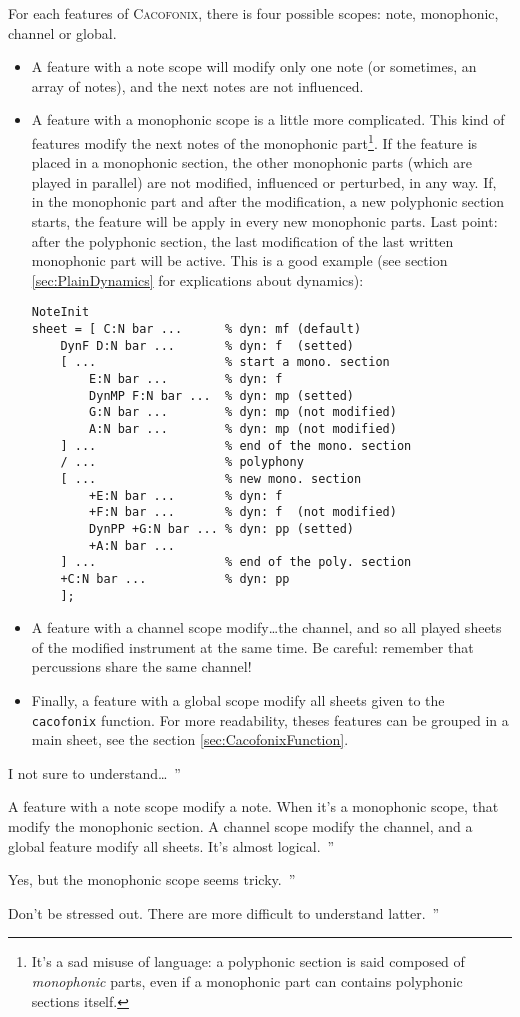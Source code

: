 \documentclass{article}
\newcommand{\cacofonix}{\textsc{Cacofonix}\xspace}
\newenvironment{meenv}{ \par \noindent \makebox[6em][r]{ \textcolor{mecolor}{Me}: `` --~}}{~''}
\newenvironment{myselfenv}{ \par \noindent \makebox[6em][r]{ \textcolor{myselfcolor}{Myself}: `` --~}}{~''}
\newcommand{\me}[1]{\begin{meenv}#1\end{meenv}}
\newcommand{\myself}[1]{\begin{myselfenv}#1\end{myselfenv}}
\begin{document}
For each features of \cacofonix, there is four possible scopes: note, monophonic, channel or global.
\begin{itemize}
	\item A feature with a note scope will modify only one note (or sometimes, an array of notes), and the next notes are not influenced.
	\item A feature with a monophonic scope is a little more complicated. This kind of features modify the next notes of the monophonic part\footnote{It's a sad misuse of language: a polyphonic section is said composed of \emph{monophonic} parts, even if a monophonic part can contains polyphonic sections itself.}. If the feature is placed in a monophonic section, the other monophonic parts (which are played in parallel) are not modified, influenced or perturbed, in any way. If, in the monophonic part and after the modification, a new polyphonic section starts, the feature will be apply in every new monophonic parts. Last point: after the polyphonic section, the last modification of the last written monophonic part will be active. This is a good example (see section \ref{sec:PlainDynamics} for explications about dynamics):
\begin{lstlisting}
NoteInit
sheet = [ C:N bar ...      % dyn: mf (default)
	DynF D:N bar ...       % dyn: f  (setted)
	[ ...                  % start a mono. section
		E:N bar ...        % dyn: f
		DynMP F:N bar ...  % dyn: mp (setted)
		G:N bar ...        % dyn: mp (not modified)
		A:N bar ...        % dyn: mp (not modified)
	] ...                  % end of the mono. section
	/ ...                  % polyphony
	[ ...                  % new mono. section
		+E:N bar ...       % dyn: f
		+F:N bar ...       % dyn: f  (not modified)
		DynPP +G:N bar ... % dyn: pp (setted)
		+A:N bar ...
	] ...                  % end of the poly. section
	+C:N bar ...           % dyn: pp
	];
\end{lstlisting}
	\item A feature with a channel scope modify\dots the channel, and so all played sheets of the modified instrument at the same time. Be careful: remember that percussions share the same channel!
	\item Finally, a feature with a global scope modify all sheets given to the \lstinline!cacofonix! function. For more readability, theses features can be grouped in a main sheet, see the section \ref{sec:CacofonixFunction}.
\end{itemize}

\me{I not sure to understand\dots}
\myself{A feature with a note scope modify a note. When it's a monophonic scope, that modify the monophonic section. A channel scope modify the channel, and a global feature modify all sheets. It's almost logical.}
\me{Yes, but the monophonic scope seems tricky.}
\myself{Don't be stressed out. There are more difficult to understand latter.}
\end{document}
